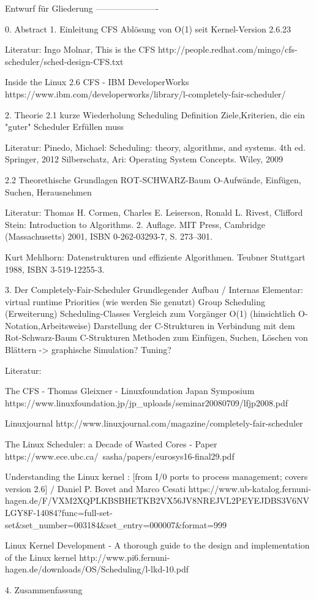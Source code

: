 Entwurf für Gliederung
----------------------

0. Abstract
1. Einleitung
	CFS Ablösung von O(1) seit Kernel-Version 2.6.23

	Literatur:
	Ingo Molnar, This is the CFS
		http://people.redhat.com/mingo/cfs-scheduler/sched-design-CFS.txt

	Inside the Linux 2.6 CFS - IBM DeveloperWorks
		https://www.ibm.com/developerworks/library/l-completely-fair-scheduler/

2. Theorie
2.1 kurze Wiederholung Scheduling
	Definition
	Ziele,Kriterien, die ein "guter" Scheduler Erfüllen muss

	Literatur:
	Pinedo, Michael: Scheduling: theory, algorithms, and systems. 4th ed.
	Springer, 2012
	Silberschatz, Ari: Operating System Concepts. Wiley, 2009

2.2 Theorethische Grundlagen ROT-SCHWARZ-Baum
	O-Aufwände, Einfügen, Suchen, Herausnehmen

	Literatur:
	Thomas H. Cormen, Charles E. Leiserson, Ronald L. Rivest, Clifford Stein: Introduction to Algorithms. 2. Auflage. MIT Press, Cambridge (Massachusetts) 2001, ISBN 0-262-03293-7, S. 273–301.

	Kurt Mehlhorn: Datenstrukturen und effiziente Algorithmen. Teubner Stuttgart 1988, ISBN 3-519-12255-3.

3. Der Completely-Fair-Scheduler
  	Grundlegender Aufbau / Internas
	Elementar: virtual runtime
	Priorities (wie werden Sie genutzt)
	Group Scheduling (Erweiterung)
	Scheduling-Classes
	Vergleich zum Vorgänger O(1) (hinsichtlich O-Notation,Arbeitsweise)
	Darstellung der C-Strukturen in Verbindung mit dem Rot-Schwarz-Baum
	C-Strukturen
	Methoden zum Einfügen, Suchen, Löschen von Blättern -> graphische Simulation?
	Tuning?

	Literatur:

	The CFS - Thomas Gleixner - Linuxfoundation Japan Symposium
		https://www.linuxfoundation.jp/jp_uploads/seminar20080709/lfjp2008.pdf

	Linuxjournal
		http://www.linuxjournal.com/magazine/completely-fair-scheduler

	The Linux Scheduler: a Decade of Wasted Cores - Paper
		https://www.ece.ubc.ca/~sasha/papers/eurosys16-final29.pdf

	Understanding the Linux kernel : [from I/0 ports to process management; covers version 2.6] / Daniel P. Bovet and Marco Cesati
		https://www.ub-katalog.fernuni-hagen.de/F/VXM2XQPLKBSBHETKB2VX56JV8NREJVL2PEYEJDBS3V6NVLGY8F-14084?func=full-set-set&set_number=003184&set_entry=000007&format=999

	Linux Kernel Development - A thorough guide to the design and implementation of the Linux kernel
		http://www.pi6.fernuni-hagen.de/downloads/OS/Scheduling/l-lkd-10.pdf

4. Zusammenfassung
